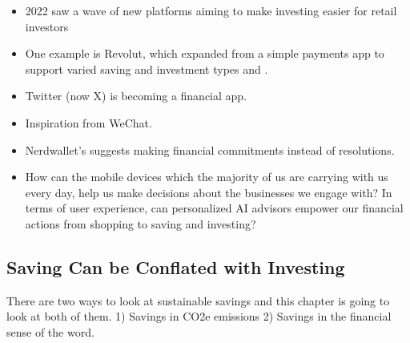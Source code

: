 \documentclass[
  letterpaper,
  DIV=11,
  numbers=noendperiod]{scrartcl}
\begin{document}
\begin{itemize}
\item
  2022 saw a wave of new platforms aiming to make investing easier for
  retail investors
\item
  One example is Revolut, which expanded from a simple payments app to
  support varied saving and investment types
  \citep{RevolutLaunchesETF2023} and
  \citep{KickstartYourInvestment2023}.
\item
  Twitter (now X) is becoming a financial app.
\item
  Inspiration from WeChat.
\item
  Nerdwallet's \citet{tommytindallFinancialActionsSpeak2023} suggests
  making financial commitments instead of resolutions.
\item
  How can the mobile devices which the majority of us are carrying with
  us every day, help us make decisions about the businesses we engage
  with? In terms of user experience, can personalized AI advisors
  empower our financial actions from shopping to saving and investing?
\end{itemize}

\subsection{Saving Can be Conflated with
Investing}\label{saving-can-be-conflated-with-investing}

There are two ways to look at sustainable savings and this chapter is
going to look at both of them. 1) Savings in CO2e emissions 2) Savings
in the financial sense of the word.
\end{document}
